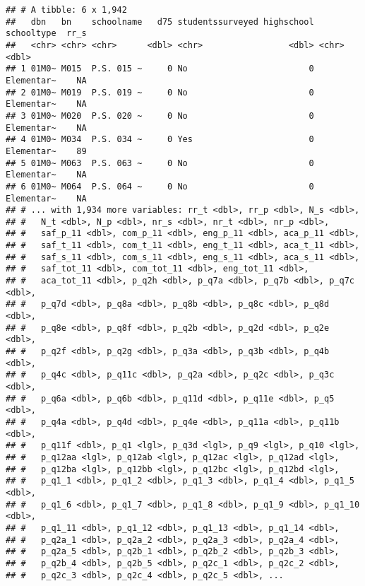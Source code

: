 \documentclass[]{article}
\begin{document}
\begin{verbatim}
## # A tibble: 6 x 1,942
##   dbn   bn    schoolname   d75 studentssurveyed highschool schooltype  rr_s
##   <chr> <chr> <chr>      <dbl> <chr>                 <dbl> <chr>      <dbl>
## 1 01M0~ M015  P.S. 015 ~     0 No                        0 Elementar~    NA
## 2 01M0~ M019  P.S. 019 ~     0 No                        0 Elementar~    NA
## 3 01M0~ M020  P.S. 020 ~     0 No                        0 Elementar~    NA
## 4 01M0~ M034  P.S. 034 ~     0 Yes                       0 Elementar~    89
## 5 01M0~ M063  P.S. 063 ~     0 No                        0 Elementar~    NA
## 6 01M0~ M064  P.S. 064 ~     0 No                        0 Elementar~    NA
## # ... with 1,934 more variables: rr_t <dbl>, rr_p <dbl>, N_s <dbl>,
## #   N_t <dbl>, N_p <dbl>, nr_s <dbl>, nr_t <dbl>, nr_p <dbl>,
## #   saf_p_11 <dbl>, com_p_11 <dbl>, eng_p_11 <dbl>, aca_p_11 <dbl>,
## #   saf_t_11 <dbl>, com_t_11 <dbl>, eng_t_11 <dbl>, aca_t_11 <dbl>,
## #   saf_s_11 <dbl>, com_s_11 <dbl>, eng_s_11 <dbl>, aca_s_11 <dbl>,
## #   saf_tot_11 <dbl>, com_tot_11 <dbl>, eng_tot_11 <dbl>,
## #   aca_tot_11 <dbl>, p_q2h <dbl>, p_q7a <dbl>, p_q7b <dbl>, p_q7c <dbl>,
## #   p_q7d <dbl>, p_q8a <dbl>, p_q8b <dbl>, p_q8c <dbl>, p_q8d <dbl>,
## #   p_q8e <dbl>, p_q8f <dbl>, p_q2b <dbl>, p_q2d <dbl>, p_q2e <dbl>,
## #   p_q2f <dbl>, p_q2g <dbl>, p_q3a <dbl>, p_q3b <dbl>, p_q4b <dbl>,
## #   p_q4c <dbl>, p_q11c <dbl>, p_q2a <dbl>, p_q2c <dbl>, p_q3c <dbl>,
## #   p_q6a <dbl>, p_q6b <dbl>, p_q11d <dbl>, p_q11e <dbl>, p_q5 <dbl>,
## #   p_q4a <dbl>, p_q4d <dbl>, p_q4e <dbl>, p_q11a <dbl>, p_q11b <dbl>,
## #   p_q11f <dbl>, p_q1 <lgl>, p_q3d <lgl>, p_q9 <lgl>, p_q10 <lgl>,
## #   p_q12aa <lgl>, p_q12ab <lgl>, p_q12ac <lgl>, p_q12ad <lgl>,
## #   p_q12ba <lgl>, p_q12bb <lgl>, p_q12bc <lgl>, p_q12bd <lgl>,
## #   p_q1_1 <dbl>, p_q1_2 <dbl>, p_q1_3 <dbl>, p_q1_4 <dbl>, p_q1_5 <dbl>,
## #   p_q1_6 <dbl>, p_q1_7 <dbl>, p_q1_8 <dbl>, p_q1_9 <dbl>, p_q1_10 <dbl>,
## #   p_q1_11 <dbl>, p_q1_12 <dbl>, p_q1_13 <dbl>, p_q1_14 <dbl>,
## #   p_q2a_1 <dbl>, p_q2a_2 <dbl>, p_q2a_3 <dbl>, p_q2a_4 <dbl>,
## #   p_q2a_5 <dbl>, p_q2b_1 <dbl>, p_q2b_2 <dbl>, p_q2b_3 <dbl>,
## #   p_q2b_4 <dbl>, p_q2b_5 <dbl>, p_q2c_1 <dbl>, p_q2c_2 <dbl>,
## #   p_q2c_3 <dbl>, p_q2c_4 <dbl>, p_q2c_5 <dbl>, ...
\end{verbatim}
\end{document}
